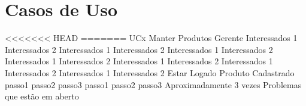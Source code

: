 \chapter{Casos de Uso}
\casoDeUso
<<<<<<< HEAD
=======
{UCx}
{Manter Produtos}
{Gerente}
{
Interessados 1 Interessados 2
Interessados 1 Interessados 2
Interessados 1 Interessados 2
Interessados 1 Interessados 2
Interessados 1 Interessados 2
Interessados 1 Interessados 2
Interessados 1 Interessados 2
}
{Estar Logado}
{Produto Cadastrado}
{
passo1
passo2
passo3
}
{
passo1
passo2
passo3
}
{Aproximadamente 3 vezes}
{
Problemas que estão em aberto
}


